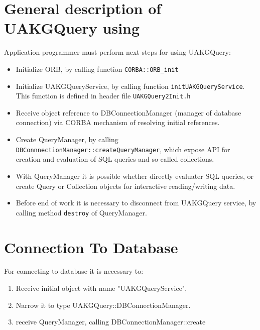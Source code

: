 \documentclass[10pt]{article}
\begin{document}
\section{ General description of UAKGQuery using  }

 
 Application programmer must perform next steps for  using UAKGQuery:
 
 \begin{itemize}
   \item Initialize ORB, by calling function \verb|CORBA::ORB_init|
   \item Initialize UAKGQueryService, by calling  function
  \verb|initUAKGQueryService|. This function is defined in header file
  \verb|UAKGQuery2Init.h|
   \item Receive object reference to DBConnectionManager
 (manager of database connection) via CORBA mechanism of resolving initial
 references.
   \item Create QueryManager, by calling \\ \verb|DBConnnectionManager::createQueryManager|, which expose API for creation and evaluation of
  SQL queries and so-called collections.
   \item With QueryManager it is possible whether directly evaluater SQL queries,
  or create Query or Collection objects for interactive reading/writing
  data.
   \item Before end of work it is necessary to disconnect from UAKGQuery
   service, by calling method \verb|destroy| of QueryManager.
 \end{itemize}

\section{ Connection To Database  }

 For connecting to database it is necessary to:
 \begin{enumerate}
   \item Receive initial object with name "UAKGQueryService", 
   \item Narrow it to type UAKGQuery::DBConnectionManager.
   \item receive QueryManager, calling DBConnectionManager::create
 \end{enumerate}
\end{document}
